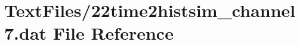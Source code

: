 \hypertarget{22time2histsim__channel7_8dat}{}\section{Text\+Files/22time2histsim\+\_\+channel7.dat File Reference}
\label{22time2histsim__channel7_8dat}
